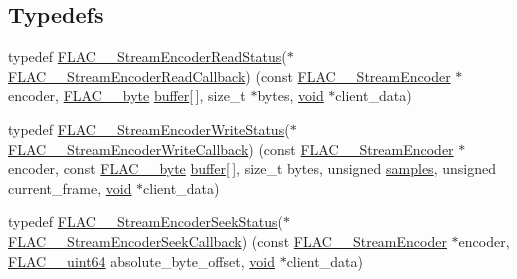 \subsection*{Typedefs}
\begin{DoxyCompactItemize}
\item 
typedef \mbox{\hyperlink{group__flac__stream__encoder_ga2e81f007fb0a7414c0bbb453f37ea37f}{F\+L\+A\+C\+\_\+\+\_\+\+Stream\+Encoder\+Read\+Status}}($\ast$ \mbox{\hyperlink{group__flac__stream__encoder_ga18b7941b93bae067192732e913536d44}{F\+L\+A\+C\+\_\+\+\_\+\+Stream\+Encoder\+Read\+Callback}}) (const \mbox{\hyperlink{struct_f_l_a_c_____stream_encoder}{F\+L\+A\+C\+\_\+\+\_\+\+Stream\+Encoder}} $\ast$encoder, \mbox{\hyperlink{ordinals_8h_a5eb569b12d5b047cdacada4d57924ee3}{F\+L\+A\+C\+\_\+\+\_\+byte}} \mbox{\hyperlink{_s_d_l__opengl__glext_8h_a76461e97a098d2c9ae20ac193d3825ae}{buffer}}\mbox{[}$\,$\mbox{]}, size\+\_\+t $\ast$bytes, \mbox{\hyperlink{_s_d_l__opengles2__gl2ext_8h_ae5d8fa23ad07c48bb609509eae494c95}{void}} $\ast$client\+\_\+data)
\item 
typedef \mbox{\hyperlink{group__flac__stream__encoder_ga3737471fd49730bb8cf9b182bdeda05e}{F\+L\+A\+C\+\_\+\+\_\+\+Stream\+Encoder\+Write\+Status}}($\ast$ \mbox{\hyperlink{group__flac__stream__encoder_ga50865125fd57c40fab6eb2f062651429}{F\+L\+A\+C\+\_\+\+\_\+\+Stream\+Encoder\+Write\+Callback}}) (const \mbox{\hyperlink{struct_f_l_a_c_____stream_encoder}{F\+L\+A\+C\+\_\+\+\_\+\+Stream\+Encoder}} $\ast$encoder, const \mbox{\hyperlink{ordinals_8h_a5eb569b12d5b047cdacada4d57924ee3}{F\+L\+A\+C\+\_\+\+\_\+byte}} \mbox{\hyperlink{_s_d_l__opengl__glext_8h_a76461e97a098d2c9ae20ac193d3825ae}{buffer}}\mbox{[}$\,$\mbox{]}, size\+\_\+t bytes, unsigned \mbox{\hyperlink{_s_d_l__opengl__glext_8h_aba70cd077c2c52c15358c231c6d293aa}{samples}}, unsigned current\+\_\+frame, \mbox{\hyperlink{_s_d_l__opengles2__gl2ext_8h_ae5d8fa23ad07c48bb609509eae494c95}{void}} $\ast$client\+\_\+data)
\item 
typedef \mbox{\hyperlink{group__flac__stream__encoder_ga6d5be3489f45fcf0c252022c65d87aca}{F\+L\+A\+C\+\_\+\+\_\+\+Stream\+Encoder\+Seek\+Status}}($\ast$ \mbox{\hyperlink{group__flac__stream__encoder_ga70b85349d5242e4401c4d8ddf6d9bbca}{F\+L\+A\+C\+\_\+\+\_\+\+Stream\+Encoder\+Seek\+Callback}}) (const \mbox{\hyperlink{struct_f_l_a_c_____stream_encoder}{F\+L\+A\+C\+\_\+\+\_\+\+Stream\+Encoder}} $\ast$encoder, \mbox{\hyperlink{ordinals_8h_aa78c8c70a3eb8a58af7436f278acde8e}{F\+L\+A\+C\+\_\+\+\_\+uint64}} absolute\+\_\+byte\+\_\+offset, \mbox{\hyperlink{_s_d_l__opengles2__gl2ext_8h_ae5d8fa23ad07c48bb609509eae494c95}{void}} $\ast$client\+\_\+data)

\end{DoxyCompactItemize}
